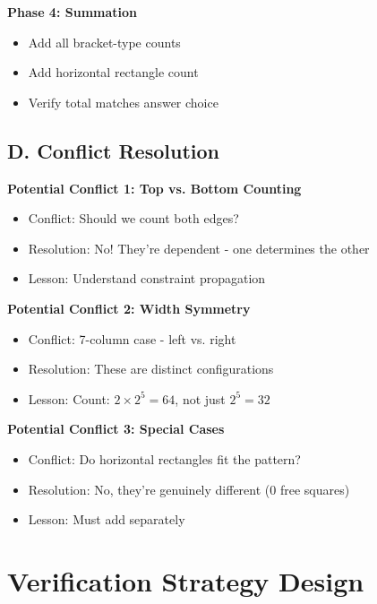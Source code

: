 \documentclass[12pt]{article}
\begin{document}
\begin{techniquesbox}
\textbf{Phase 4: Summation}
\begin{itemize}
    \item Add all bracket-type counts
    \item Add horizontal rectangle count
    \item Verify total matches answer choice
\end{itemize}

\subsection*{D. Conflict Resolution}

\textbf{Potential Conflict 1: Top vs. Bottom Counting}
\begin{itemize}
    \item Conflict: Should we count both edges?
    \item Resolution: No! They're dependent - one determines the other
    \item Lesson: Understand constraint propagation
\end{itemize}

\textbf{Potential Conflict 2: Width Symmetry}
\begin{itemize}
    \item Conflict: 7-column case - left vs. right
    \item Resolution: These are distinct configurations
    \item Lesson: Count: $2 \times 2^5 = 64$, not just $2^5 = 32$
\end{itemize}

\textbf{Potential Conflict 3: Special Cases}
\begin{itemize}
    \item Conflict: Do horizontal rectangles fit the pattern?
    \item Resolution: No, they're genuinely different (0 free squares)
    \item Lesson: Must add separately
\end{itemize}

\end{techniquesbox}

\section{Verification Strategy Design}
\end{document}
